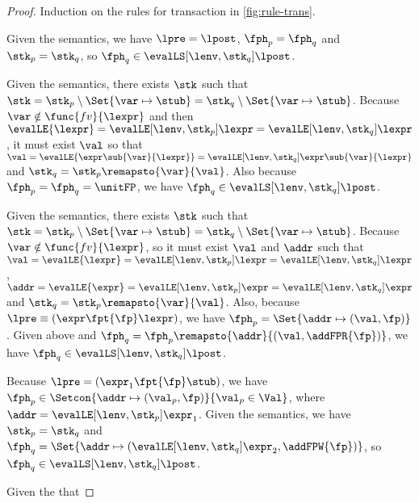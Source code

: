 \begin{proof}
Induction on the rules for transaction in \fig \ref{fig:rule-trans}.

\caseB{\(\trans \equiv \pskip\)}

Given the semantics, we have \( \lpre = \lpost \), \( \fph_{p} = \fph_{q} \) and \( \stk_{p} = \stk_{q} \), so \( \fph_{q} \in \evalLS[\lenv, \stk_{q}]{\lpost} \).

\caseB{\(\trans \equiv ( \pass{\var}{\expr} ) \)}

Given the semantics, there exists \( \stk \) such that \( \stk = \stk_{p} \setminus \Set{\var \mapsto \stub} = \stk_{q} \setminus \Set{\var \mapsto \stub} \).
Because \( \var \notin \func{fv}{\lexpr} \) and then \( \evalLE{\lexpr} = \evalLE[\lenv, \stk_{p}]{\lexpr} = \evalLE[\lenv, \stk_{q}]{\lexpr} \), it must exist \( \val \) so that \( \val = \evalLE{\expr\sub{\var}{\lexpr}} = \evalLE[\lenv, \stk_{q}]{\expr\sub{\var}{\lexpr}} \) and \( \stk_{q} = \stk_{p}\remapsto{\var}{\val} \).
Also because \( \fph_{p} = \fph_{q} = \unitFP \), we have \( \fph_{q} \in \evalLS[\lenv, \stk_{q}]{\lpost} \).

\caseB{\(\trans \equiv ( \pderef{\var}{\expr} ) \)}

Given the semantics, there exists \( \stk \) such that \( \stk = \stk_{p} \setminus \Set{\var \mapsto \stub} = \stk_{q} \setminus \Set{\var \mapsto \stub} \).
Because \( \var \notin \func{fv}{\lexpr} \), so it must exist \( \val \) and \( \addr \) such that \( \val = \evalLE{\lexpr} = \evalLE[\lenv, \stk_{p}]{\lexpr} = \evalLE[\lenv, \stk_{q}]{\lexpr} \), \( \addr = \evalLE{\expr} = \evalLE[\lenv, \stk_{p}]{\expr} = \evalLE[\lenv, \stk_{q}]{\expr} \) and \(  \stk_{q} = \stk_{p}\remapsto{\var}{\val} \).
Also, because \( \lpre \equiv ( \expr \fpt{\fp} \lexpr ) \), we have \( \fph_{p} = \Set{\addr \mapsto (\val, \fp) }\).
Given above and \( \fph_{q} = \fph_{p}\remapsto{\addr}{ ( \val, \addFPR{\fp} ) } \), we have \( \fph_{q} \in \evalLS[\lenv, \stk_{q}]{\lpost} \).


Because \( \lpre = (\expr_{1} \fpt{\fp} \stub ) \), we have \( \fph_{p} \in \Setcon{ \addr \mapsto (\val_{p} , \fp) }{ \val_{p} \in \Val } \), where \( \addr = \evalLE[\lenv, \stk_{p}]{\expr_{1}} \).
Given the semantics, we have \( \stk_{p} = \stk_{q} \) and \( \fph_{q} = \Set{\addr \mapsto ( \evalLE[\lenv, \stk_{q}]{\expr_{2}},  \addFPW{\fp} ) } \), so \( \fph_{q} \in \evalLS[\lenv, \stk_{q}]{\lpost} \).

Given the \ih that 


\end{proof}


